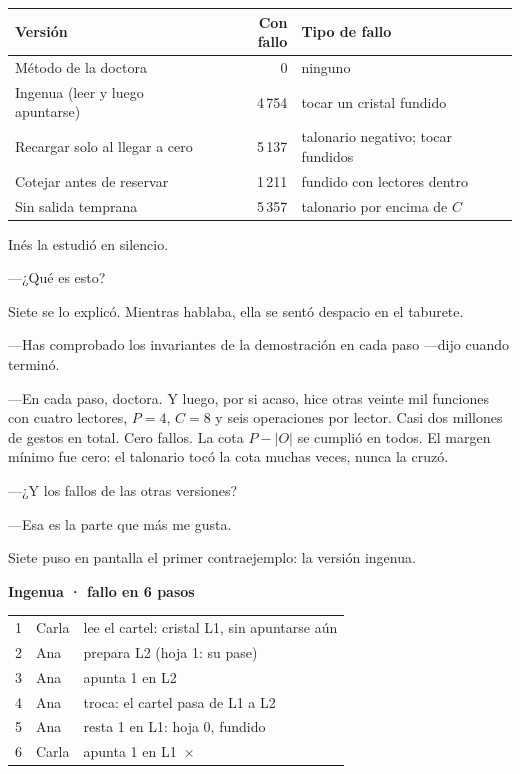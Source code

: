 \begin{documento}[El teatro de Siete · 20\,000 funciones por versión · 3 lectores, $P=3$, $C=6$]
\begin{tabular}{@{}p{4.2cm} r p{3.2cm}@{}}
\toprule
\textbf{Versión} & \textbf{Con fallo} & \textbf{Tipo de fallo} \\
\midrule
Método de la doctora & 0 & ninguno \\
Ingenua (leer y luego apuntarse) & 4\,754 & tocar un cristal fundido \\
Recargar solo al llegar a cero & 5\,137 & talonario negativo; tocar fundidos \\
Cotejar antes de reservar & 1\,211 & fundido con lectores dentro \\
Sin salida temprana & 5\,357 & talonario por encima de $C$ \\
\bottomrule
\end{tabular}
\end{documento}

Inés la estudió en silencio.

---¿Qué es esto?

Siete se lo explicó. Mientras hablaba, ella se sentó despacio en el taburete.

---Has comprobado los invariantes de la demostración en cada paso ---dijo cuando terminó.

---En cada paso, doctora. Y luego, por si acaso, hice otras veinte mil funciones con cuatro lectores, $P=4$, $C=8$ y seis operaciones por lector. Casi dos millones de gestos en total. Cero fallos. La cota $P - |O|$ se cumplió en todos. El margen mínimo fue cero: el talonario tocó la cota muchas veces, nunca la cruzó.

---¿Y los fallos de las otras versiones?

---Esa es la parte que más me gusta.

\escena
Siete puso en pantalla el primer contraejemplo: la versión ingenua.

\begin{pizarra}
\textbf{Ingenua · fallo en 6 pasos}\\[1mm]
\begin{tabular}{@{}c l p{4.6cm}@{}}
1 & Carla & lee el cartel: cristal L1, sin apuntarse aún \\
2 & Ana & prepara L2 (hoja 1: su pase) \\
3 & Ana & apunta 1 en L2 \\
4 & Ana & troca: el cartel pasa de L1 a L2 \\
5 & Ana & resta 1 en L1: hoja 0, \textcolor{oxido}{fundido} \\
6 & Carla & apunta 1 en L1\ \textcolor{oxido}{$\boldsymbol\times$} \\
\end{tabular}
\end{pizarra}

